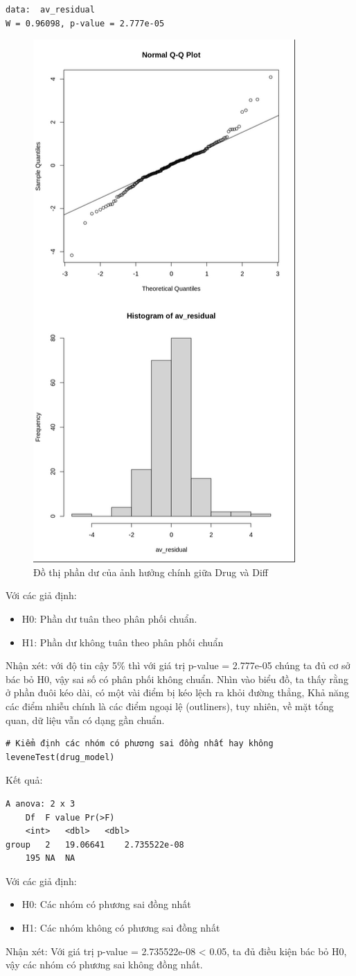 \begin{itemize}
\begin{lstlisting}
data:  av_residual
W = 0.96098, p-value = 2.777e-05
\end{lstlisting}
\begin{figure}[H]
    \centering
    \includegraphics[width=0.5\linewidth]{part01_figures/17.png}
    \caption{Đồ thị phần dư của ảnh hưởng chính giữa Drug và Diff}
    \label{fig:Đồ thị phần dư của ảnh hưởng chính giữa Drug và Diff}
\end{figure}
Với các giả định:
    \begin{itemize}
        \item H0: Phần dư tuân theo phân phối chuẩn.
        \item H1: Phần dư không tuân theo phân phối chuẩn
    \end{itemize}
Nhận xét: với độ tin cậy 5\% thì với giá trị p-value = 2.777e-05 chúng ta đủ cơ sở bác bỏ H0, vậy sai số có phân phối không chuẩn. Nhìn vào biểu đồ, ta thấy rằng ở phần đuôi kéo dài, có một vài điểm bị kéo lệch ra khỏi đường thẳng, Khả năng các điểm nhiễu chính là các điểm ngoại lệ (outliners), tuy nhiên, về mặt tổng quan, dữ liệu vẫn có dạng gần chuẩn.

\newpage
    \begin{lstlisting}
# Kiểm định các nhóm có phương sai đồng nhất hay không
leveneTest(drug_model)
    \end{lstlisting}
Kết quả:
\begin{lstlisting}
A anova: 2 x 3 	
    Df	F value	Pr(>F)
	<int>	<dbl>	<dbl>
group	2	19.06641	2.735522e-08
	195	NA	NA
\end{lstlisting}
Với các giả định:
    \begin{itemize}
        \item H0: Các nhóm có phương sai đồng nhất
        \item H1: Các nhóm không có phương sai đồng nhất
    \end{itemize}
Nhận xét: Với giá trị p-value = 2.735522e-08 < 0.05, ta đủ điều kiện bác bỏ H0, vậy các nhóm có phương sai không đồng nhất.


\end{itemize}

